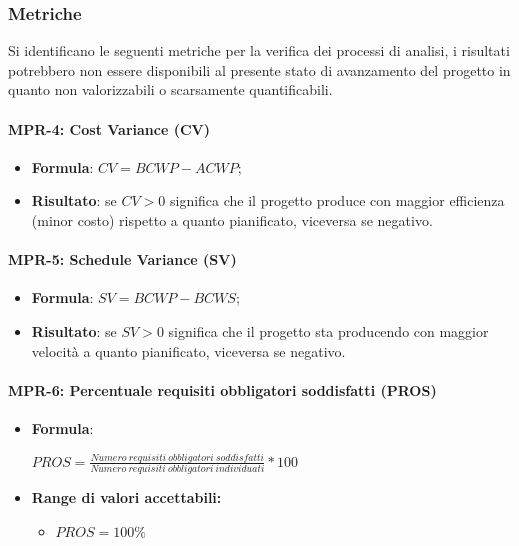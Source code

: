 \subsubsection{Metriche} \label{_metricheProcesso}

Si identificano le seguenti metriche per la verifica dei processi di analisi, i risultati potrebbero non essere disponibili al presente stato di avanzamento del progetto
in quanto non valorizzabili o scarsamente quantificabili.

\paragraph{MPR-4: Cost Variance (CV)} \label{_MPR-4}
\begin{itemize}
    \item \textbf{Formula}: $CV = BCWP - ACWP$;
    \item \textbf{Risultato}: se $CV > 0$ significa che il progetto produce con maggior efficienza (minor costo) rispetto a quanto pianificato, viceversa se negativo.
\end{itemize}

\paragraph{MPR-5: Schedule Variance (SV)} \label{_MPR-5}
\begin{itemize}
    \item \textbf{Formula}: $SV = BCWP - BCWS$;
    \item \textbf{Risultato}: se $SV > 0$ significa che il progetto sta producendo con maggior velocità a quanto pianificato, viceversa se negativo.
\end{itemize}

\paragraph{MPR-6: Percentuale requisiti obbligatori soddisfatti (PROS)}

\begin{itemize}
    \item \textbf{Formula}:
          \begin{center}
              \(PROS = \frac{Numero\ requisiti\ obbligatori\ soddisfatti}{Numero\ requisiti\  obbligatori\ individuati}*100\)
          \end{center}
    \item \textbf{Range di valori accettabili:}
          \begin{itemize}
              \item  $PROS = 100\%$
          \end{itemize}
\end{itemize}

